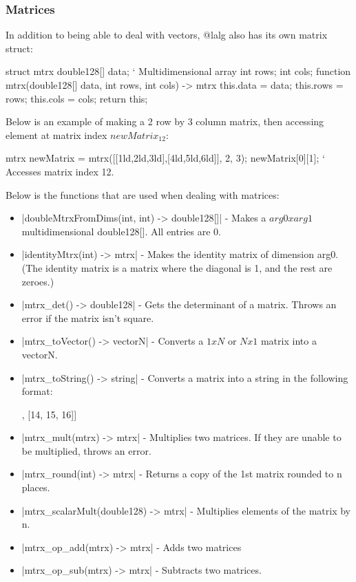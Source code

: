 \documentclass[12pt, letterpaper, oneside]{article}
\begin{document}
	\subsubsection{Matrices}
	In addition to being able to deal with vectors, @lalg also has its own matrix struct:
	
	
	\begin{spverbatim}
		struct mtrx {
			double128[] data; ` Multidimensional array
			int rows;
			int cols;
			function mtrx(double128[] data, int rows, int cols) -> mtrx {
				this.data = data;
				this.rows = rows;
				this.cols = cols;
				return this;
			}
		}
	\end{spverbatim}
	Below is an example of making a 2 row by 3 column matrix, then accessing element at matrix index $newMatrix_{12}$:
	\begin{spverbatim}
		mtrx newMatrix = mtrx([[1ld,2ld,3ld],[4ld,5ld,6ld]], 2, 3);
		newMatrix[0][1]; ` Accesses matrix index 12.
	\end{spverbatim}
	Below is the functions that are used when dealing with matrices:
	\begin{itemize}
		\item[--] \spverb|doubleMtrxFromDims(int, int) -> double128[]| - Makes a $arg0 x arg1$ multidimensional double128[]. All entries are 0.
		\item[--] \spverb|identityMtrx(int) -> mtrx| - Makes the identity matrix of dimension arg0. (The identity matrix is a matrix where the diagonal is 1, and the rest are zeroes.)
		\item[--] \spverb|mtrx_det() -> double128| - Gets the determinant of a matrix. Throws an error if the matrix isn't square.
		\item[--] \spverb|mtrx_toVector() -> vectorN| - Converts a $1 x N$ or $N x 1$ matrix into a vectorN.
		\item[--] \spverb|mtrx_toString() -> string| - Converts a matrix into a string in the following format:
		\begin{spverbatim}
			[[11, 12, 13],
			 [14, 15, 16]]
		\end{spverbatim}
		\item[--] \spverb|mtrx_mult(mtrx) -> mtrx| - Multiplies two matrices. If they are unable to be multiplied, throws an error.
		\item[--] \spverb|mtrx_round(int) -> mtrx| - Returns a copy of the 1st matrix rounded to n places.
		\item[--] \spverb|mtrx_scalarMult(double128) -> mtrx| - Multiplies elements of the matrix by n.
		\item[--] \spverb|mtrx_op_add(mtrx) -> mtrx| - Adds two matrices
		\item[--] \spverb|mtrx_op_sub(mtrx) -> mtrx| - Subtracts two matrices.
	\end{itemize}
\end{document}
